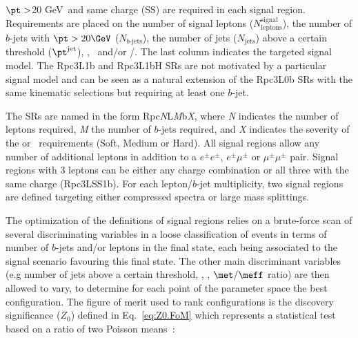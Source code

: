 \begin{table}[tbh!]
{$\pt>$20 GeV~and same charge (SS) are required in each signal region. Requirements 
are placed on the number of signal leptons ($N_{\textrm{leptons}}^{\textrm{signal}}$), the number of 
$b$-jets with $\pt>20 \GeV$ ($N_{b\textrm{-jets}}$), the number of jets ($N_{\textrm{jets}}$) above a certain \pt threshold ($\pt^{\textrm{jet}}$), 
\met, \meff\ and/or \met/\meff. The last column indicates the targeted signal model. The Rpc3L1b and Rpc3L1bH SRs 
are not motivated by a particular signal model and can be seen as a natural extension of the Rpc3L0b SRs with the same kinematic selections 
but requiring at least one $b$-jet.}
\label{tab:SRdef3}
\end{table}

The SRs are named in the form Rpc\textit{N}L{\textit M}b{\textit X}, where {\textit N} indicates the number of leptons required, {\textit M} the number of $b$-jets required, and {\textit X} indicates the severity 
of the \met or \meff\ requirements (Soft, Medium or Hard). All signal regions allow any number of additional leptons in addition to a $e^\pm e^\pm$,
$e^\pm \mu^\pm$ or $\mu^\pm \mu^\pm$ pair. Signal regions with 3 leptons can be either any charge combination or all three with the same charge (Rpc3LSS1b).
For each lepton/$b$-jet multiplicity, two signal regions are defined targeting either compressed spectra or large mass splittings. 

The optimization of the definitions of signal regions relies on a brute-force
scan of several discriminating variables in a loose classification of events 
in terms of number of $b$-jets and/or leptons in the final state, each being 
associated to the signal scenario favouring this final state.
The other main discriminant variables (e.g number of jets above a certain \pt threshold, \meff, \met, $\met/\meff$ ratio) are then 
allowed to vary, 
to determine for each point of the parameter space the best configuration. 
The figure of merit used to rank configurations is the discovery significance ($Z_0$)
defined in Eq.~\ref{eq:Z0.FoM} which represents
a statistical test based on a ratio of two Poisson means~\cite{Cousins:2009}:

